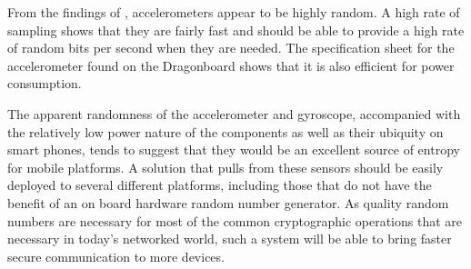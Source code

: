 
From the findings of \cite{voris}, accelerometers appear to be highly random. A
high rate of sampling shows that they are fairly fast and should be able to
provide a high rate of random bits per second when they are needed. The
specification sheet for the accelerometer found on the Dragonboard shows that it
is also efficient for power consumption.

The apparent randomness of the accelerometer and gyroscope, accompanied with the
relatively low power nature of the components as well as their ubiquity on smart
phones, tends to suggest that they would be an excellent source of entropy for
mobile platforms. A solution that pulls from these sensors should be easily
deployed to several different platforms, including those that do not have the
benefit of an on board hardware random number generator. As quality random
numbers are necessary for most of the common cryptographic operations that are
necessary in today's networked world, such a system will be able to bring faster
secure communication to more devices. 
